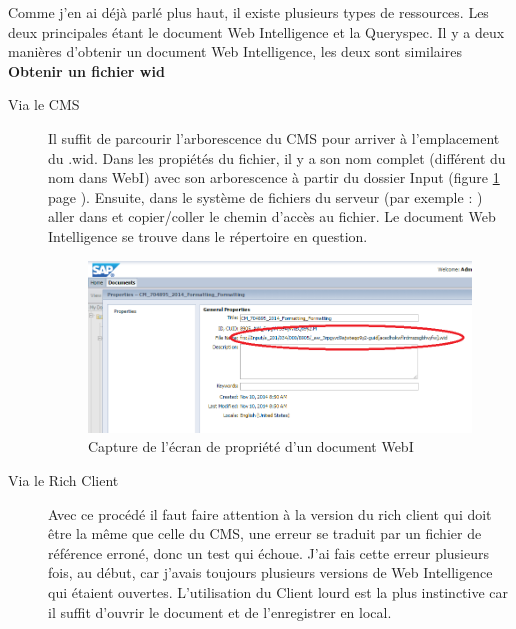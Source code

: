 Comme j'en ai d\'{e}j\`{a} parl\'{e} plus haut, il existe plusieurs types de ressources. Les deux principales \'{e}tant le document Web Intelligence et la \gls{Queryspec}.
Il y a deux mani\`{e}res d'obtenir un document Web Intelligence, les deux sont similaires
\textbf{Obtenir un fichier wid}
\begin{description}
	\item	[Via le CMS] 
	\begin{sloppypar}
	Il suffit de parcourir l'arborescence du CMS pour arriver \`{a} l'emplacement du .wid. Dans les propi\'{e}t\'{e}s du fichier, il y a son nom complet (diff\'{e}rent du nom dans WebI) avec son arborescence \`{a} partir du dossier Input (figure \ref{figure:widFileLocation} page \pageref{figure:widFileLocation} ). Ensuite, dans le syst\`{e}me de fichiers du serveur (par exemple : ) aller dans 
	 et copier/coller le chemin d'acc\`{e}s au fichier. Le document Web Intelligence se trouve dans le r\'{e}pertoire en question.
	\end{sloppypar}
\begin{figure}[!ht]
  \centering
      \includegraphics[width=\textwidth]{images/widFileLocation.png}
  \caption{Capture de l'\'{e}cran de propri\'{e}t\'{e} d'un document WebI}
	\label{figure:widFileLocation}
\end{figure}
	\item[Via le Rich Client]
	Avec ce proc\'{e}d\'{e} il faut faire attention \`{a} la version du rich client qui doit \^{e}tre la m\^{e}me que celle du CMS, une erreur se traduit par un fichier de r\'{e}f\'{e}rence erron\'{e}, donc un test qui \'{e}choue. J'ai fais cette erreur plusieurs fois, au d\'{e}but, car j'avais toujours plusieurs versions de Web Intelligence qui \'{e}taient ouvertes. L'utilisation du \gls{Client lourd} est la plus instinctive car il suffit d'ouvrir le document et de l'enregistrer en local.
\end{description}

